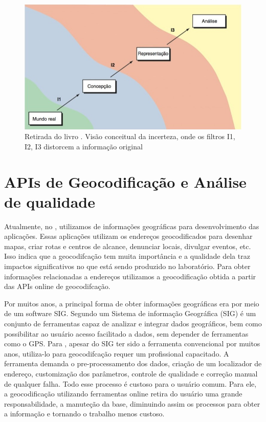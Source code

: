 \begin{figure}[ht]
   \centering
   \includegraphics[width=\textwidth]{Figuras/incertezaLivro.jpeg}
   \caption{Retirada do livro \cite{longley2013}. Visão conceitual da incerteza, onde os filtros I1, I2, I3 distorcem a informação original}
   \label{fig:incerteza}
\end{figure}

\section{APIs de Geocodificação e Análise de qualidade}
Atualmente, no \cite[TerraLAB - Laboratório de pesquisa e capacitação em software]{terralab}, utilizamos de informações geográficas para desenvolvimento das aplicações. Essas aplicações utilizam os endereços geocodificados para desenhar mapas, criar rotas e centros de alcance, denunciar locais, divulgar eventos, etc. Isso indica que a geocodifcação tem muita importância e a qualidade dela traz impactos significativos no que está sendo produzido no laboratório. 
Para obter informações relacionadas a endereços utilizamos a geocodificação obtida a partir das APIs online de geocodifcação. 

Por muitos anos, a principal forma de obter informações geográficas era por meio de um software SIG. Segundo \cite{stein2021geoprocessamento} um Sistema de informação Geográfica (SIG) é um conjunto de ferramentas capaz de analizar e integrar dados geográficos, bem como possibilitar ao usuário acesso facilitado a dados, sem depender de ferramentas como o GPS.
Para \cite{Chow2016}, apesar do SIG ter sido a ferramenta convencional por muitos anos, utiliza-lo para geocodifcação requer um profissional capacitado. A ferramenta demanda o pre-processamento dos dados, criação de um localizador de endereço, customização dos parâmetros, controle de qualidade e correção manual de qualquer falha. Todo esse processo é custoso para o usuário comum. Para ele, a geocodificação utilizando ferramentas online retira do usuário uma grande responsabilidade, a manuteção da base, diminuindo assim os processos para obter a informação e tornando o trabalho menos custoso. 

